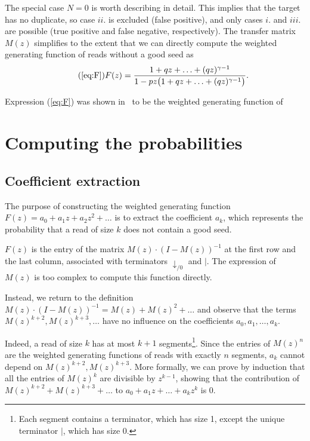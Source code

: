 \documentclass{article}
\begin{document}
The special case $N=0$ is worth describing in detail. This implies that
the target has no duplicate, so case $ii.$ is excluded (false positive),
and only cases $i.$ and $iii.$ are possible (true positive and false
negative, respectively). The transfer matrix $M(z)$ simplifies to the
extent that we can directly compute the weighted generating function of
reads without a good seed as
\begin{equation}
\tag{\ref{eq:F}}
F(z) = \frac{1+qz+\ldots+(qz)^{\gamma-1}}
  {1-pz \big(1+qz+\ldots+(qz)^{\gamma-1} \big)}.
\end{equation}

Expression (\ref{eq:F}) was shown in~\cite{filion2018analytic} to be the
weighted generating function of


\section{Computing the probabilities}
\label{sec:compute}

\subsection{Coefficient extraction}
\label{sec:extract}

The purpose of constructing the weighted generating function $F(z) = a_0 +
a_1z + a_2z^2 + \ldots$ is to extract the coefficient $a_k$, which
represents the probability that a read of size $k$ does not contain a
good seed.

$F(z)$ is the entry of the matrix $M(z) \cdot (I-M(z))^{-1}$ at the first
row and the last column, associated with terminators $\downarrow_{/0}$ and
$|$. The expression of $M(z)$ is too complex to compute this function
directly.


Instead, we return to the definition $M(z) \cdot (I-M(z))^{-1} =
M(z) + M(z)^2 + \ldots$ and observe that the terms $M(z)^{k+2},
M(z)^{k+3}, \ldots$ have no influence on the coefficients $a_0, a_1,
\ldots, a_k$.

Indeed, a read of size $k$ has at most $k+1$ segments\footnote{Each
segment contains a terminator, which has size 1, except the unique
terminator $|$, which has size 0.}. Since the entries of $M(z)^n$ are the
weighted generating functions of reads with exactly $n$ segments, $a_k$
cannot depend on $M(z)^{k+2}, M(z)^{k+3}$. More formally, we can prove by
induction that all the entries of $M(z)^k$ are divisible by $z^{k-1}$,
showing that the contribution of $M(z)^{k+2} + M(z)^{k+3} + \ldots$ to
$a_0 + a_1z + \ldots +a_kz^k$ is $0$.
\end{document}
